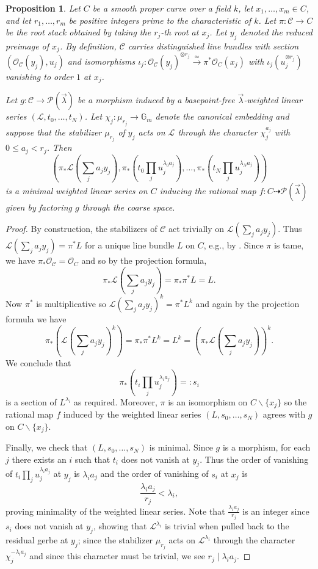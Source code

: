 \documentclass[a4paper,12pt]{amsart}
\newtheorem{prop}[thm]{Proposition}
\theoremstyle{definition}
\newcommand{\bG}{\mathbb{G}}
\newcommand{\cO}{\mathcal{O}}
\newcommand{\cC}{\mathcal{C}}
\renewcommand{\setminus}{\smallsetminus}
\begin{document}
	\begin{prop}\label{prop:tuningstack->min-lin-ser}
		Let $C$ be a smooth proper curve over a field $k$, let $x_1,\dots,x_m\in C$, and let $r_1,\dots,r_m$ be positive integers prime to the characteristic of $k$. Let $\pi\colon\mathcal{C}\to C$ be the root stack obtained by taking the $r_j$-th root at $x_j$. Let $y_j$ denoted the reduced preimage of $x_j$. By definition, $\cC$ carries distinguished line bundles with section $(\cO_{\cC}(y_j),u_j)$ and isomorphisms $\iota_j\colon\cO_{\cC}(y_j)^{\otimes r_j}\xrightarrow{\simeq}\pi^*\cO_C(x_j)$ with $\iota_j(u_j^{\otimes r_j})$ vanishing to order $1$ at $x_j$.
		
		Let $g\colon\mathcal{C} \to \mathcal{P}(\vec{\lambda})$ be a morphism induced by a basepoint-free $\vec{\lambda}$-weighted linear series $(\mathcal{L}, t_0,\ldots, t_N)$. Let $\chi_j\colon\mu_{r_j}\to\bG_m$ denote the canonical embedding and suppose that the stabilizer $\mu_{r_j}$ of $y_j$ acts on $\mathcal{L}$ through the character $\chi_j^{a_j}$ with $0\leq a_j<r_j$. Then 
		$$
		\left(\pi_*\mathcal{L}(\sum_j a_j y_j), \pi_*(t_0 \prod_j u_j^{\lambda_0 a_j}), \ldots, \pi_*(t_N \prod_j u_j^{\lambda_N a_j})\right)
		$$
		is a minimal weighted linear series on $C$ inducing the rational map $f\colon C \dashrightarrow \mathcal{P}(\vec{\lambda})$ given by factoring $g$ through the coarse space. 
	\end{prop}
	\begin{proof} By construction, the stabilizers of $\mathcal{C}$ act trivially on $\mathcal{L}(\sum_j a_j y_j)$. Thus $\mathcal{L}(\sum_j a_j y_j) = \pi^*L$ for a unique line bundle $L$ on $C$, e.g., by \cite[Thm. 10.3]{Alper}. Since $\pi$ is tame, we have $\pi_*\mathcal{O}_{\mathcal{C}} = \mathcal{O}_C$ and so by the projection formula, 
		$$
		\pi_*\mathcal{L}(\sum_j a_j y_j) = \pi_*\pi^*L = L. 
		$$
		Now $\pi^*$ is multiplicative so $\mathcal{L}(\sum_j a_j y_j)^k = \pi^*L^k$ and again by the projection formula we have 
		$$
		\pi_*(\mathcal{L}(\sum_j a_j y_j)^k) = \pi_*\pi^*L^k = L^k = (\pi_*\mathcal{L}(\sum_j a_j y_j))^k.
		$$
		We conclude that 
		$$
		\pi_*(t_i \prod_j u_j^{\lambda_i a_j}) =: s_i
		$$
		is a section of $L^{\lambda_i}$ as required. Moreover, $\pi$ is an isomorphism on $C\setminus\{x_j\}$ so the rational map $f$ induced by the weighted linear series $(L, s_0, \ldots, s_N)$ agrees with $g$ on $C\setminus\{x_j\}$. 
		
		Finally, we check that $(L, s_0, \ldots, s_N)$ is minimal. Since $g$ is a morphism, for each $j$ there exists an $i$ such that $t_i$ does not vanish at $y_j$. Thus the order of vanishing of $t_i\prod_j u_j^{\lambda_i a_j}$ at $y_j$ is $\lambda_i a_j$ and the order of vanishing of $s_i$ at $x_j$ is 
		$$
		\frac{\lambda_i a_j}{r_j} < \lambda_i,$$
		proving minimality of the weighted linear series. Note that $\frac{\lambda_i a_j}{r_j}$ is an integer since $s_i$ does not vanish at $y_j$, showing that $\mathcal{L}^{\lambda_i}$ is trivial when pulled back to the residual gerbe at $y_j$; since the stabilizer $\mu_{r_j}$ acts on $\mathcal{L}^{\lambda_i}$ through the character $\chi_j^{-\lambda_i a_j}$ and since this character must be trivial, we see $r_j\mid\lambda_i a_j$.
	\end{proof} 
	
\end{document}
